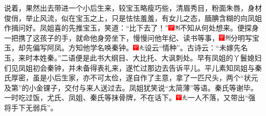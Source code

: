 说着，果然出去带进一个小后生来，较宝玉略瘦巧些，清眉秀目，粉面朱唇，身材俊俏，举止风流，似在宝玉之上，只是怯怯羞羞，有女儿之态，腼腆含糊的向凤姐作揖问好。凤姐喜的先推宝玉，笑道：“比下去了！”{\includegraphics[width=3mm]{../Images/00002}\includegraphics[width=3mm]{../Images/00011}\footnotesize \kaishu 不知从何处想来。}便探身一把携了这孩子的手，就命他身旁坐下，慢慢问他年纪、读书等事，{\includegraphics[width=3mm]{../Images/00002}\includegraphics[width=3mm]{../Images/00011}\footnotesize \kaishu 分明写宝玉，却先偏写阿凤。}方知他学名唤秦钟。{\includegraphics[width=3mm]{../Images/00002}\includegraphics[width=3mm]{../Images/00012}\footnotesize \kaishu 设云“情种”。古诗云：“未嫁先名玉，来时本姓秦。”二语便是此书大纲目、大比托、大讽刺处。}早有凤姐的丫鬟媳妇们见凤姐初会秦钟，并未备得表礼来，遂忙过那边去告诉平儿。平儿素知凤姐与秦氏厚密，虽是小后生家，亦不可太俭，遂自作了主意，拿了一匹尺头，两个“状元及第”的小金锞子，交付与来人送过去。凤姐犹笑说“太简薄”等语。秦氏等谢毕。一时吃过饭，尤氏、凤姐、秦氏等抹骨牌，不在话下。{\includegraphics[width=3mm]{../Images/00002}\includegraphics[width=3mm]{../Images/00012}\footnotesize \kaishu 一人不落，又带出“强将手下无弱兵”。}

